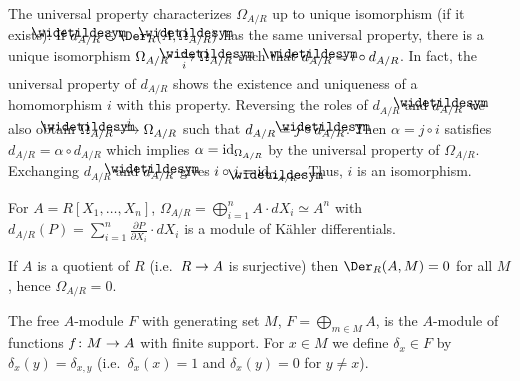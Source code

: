 \documentclass[a4paper,parskip=half,numbers=enddot, DIV=12, headheight=30pt]{scrreprt}
\begin{document}
\begin{rem*}
    \begin{alphanumerate}
        \item 
            The universal property characterizes $\Omega_{A/R}$ up to unique isomorphism (if it exists): If $\snake d_{A/R} \in\Der_R(A,\snake \Omega_{A/R})$ has the same universal property, there is a unique isomorphism $\Omega_{A/R}\isomorphism[i] \snake \Omega_{A/R}$ such that $\snake d _{A/R} = i \circ d_{A/R}$. In fact, the universal property of $d_{A/R}$ shows the existence and uniqueness of a homomorphism $i$ with this property. Reversing the roles of $d_{A/R}$ and $\snake d_{A/R}$ we also obtain $\snake\Omega_{A/R} \morphism[j]\Omega_{A/R}$ such that $d_{A/R} = j\circ \snake d_{A/R}$. Then $\alpha = j\circ i$ satisfies $d_{A/R} = \alpha\circ d_{A/R}$ which implies $\alpha= \operatorname{id}_{\Omega_{A/R}}$ by the universal property of $\Omega_{A/R}$. Exchanging $d_{A/R}$ and $\snake d_{A/R}$ gives $i \circ j = \id_{\snake\Omega_{A/R}}$. Thus, $i$ is an isomorphism.
        \item
            For $A= R[X_1,\ldots,X_n]$, $\Omega_{A/R} = \bigoplus_{i=1}^n A\cdot dX_i \simeq A^n$ with $d_{A/R} (P) = \sum_{i=1}^n \frac{\partial P }{\partial X_i} \cdot dX_i$ is a module of Kähler differentials.
        \item 
            If $A$ is a quotient of $R$ (i.e.\ $R\morphism A$ is surjective) then $\Der_R(A,M) = 0$ for all $M$, hence $\Omega_{A/R} = 0$.
    \end{alphanumerate}
\end{rem*}
\begin{defi} 
    The free $A$-module $F$ with generating set $M$, $F=\bigoplus_{m\in M}A$, is the $A$-module of functions $f\colon M \morphism A$ with finite support. For $x\in M$ we define $\delta_x \in F$ by $\delta_x(y) = \delta_{x,y}$ (i.e.\ $\delta_x(x)=1$ and $\delta_x(y)=0$ for $y\not=x$).
\end{defi}
\end{document}
